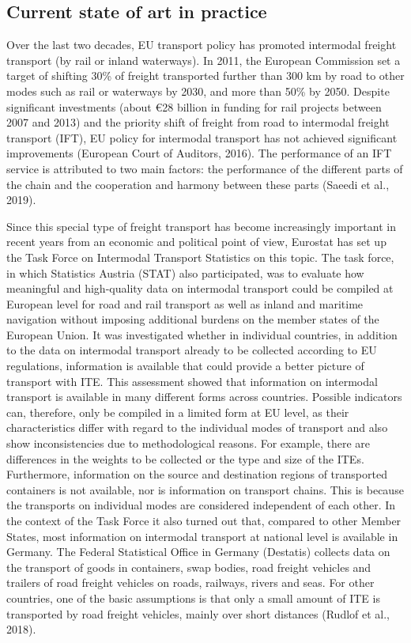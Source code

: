 \documentclass[
]{book}
\begin{document}
\hypertarget{current-state-of-art-in-practice-21}{%
\subsection*{Current state of art in practice}\label{current-state-of-art-in-practice-21}}

Over the last two decades, EU transport policy has promoted intermodal freight transport (by rail or inland waterways). In 2011, the European Commission set a target of shifting 30\% of freight transported further than 300 km by road to other modes such as rail or waterways by 2030, and more than 50\% by 2050. Despite significant investments (about €28 billion in funding for rail projects between 2007 and 2013) and the priority shift of freight from road to intermodal freight transport (IFT), EU policy for intermodal transport has not achieved significant improvements (European Court of Auditors, 2016). The performance of an IFT service is attributed to two main factors: the performance of the different parts of the chain and the cooperation and harmony between these parts (Saeedi et al., 2019).

Since this special type of freight transport has become increasingly important in recent years from an economic and political point of view, Eurostat has set up the Task Force on Intermodal Transport Statistics on this topic. The task force, in which Statistics Austria (STAT) also participated, was to evaluate how meaningful and high-quality data on intermodal transport could be compiled at European level for road and rail transport as well as inland and maritime navigation without imposing additional burdens on the member states of the European Union. It was investigated whether in individual countries, in addition to the data on intermodal transport already to be collected according to EU regulations, information is available that could provide a better picture of transport with ITE. This assessment showed that information on intermodal transport is available in many different forms across countries. Possible indicators can, therefore, only be compiled in a limited form at EU level, as their characteristics differ with regard to the individual modes of transport and also show inconsistencies due to methodological reasons. For example, there are differences in the weights to be collected or the type and size of the ITEs. Furthermore, information on the source and destination regions of transported containers is not available, nor is information on transport chains. This is because the transports on individual modes are considered independent of each other. In the context of the Task Force it also turned out that, compared to other Member States, most information on intermodal transport at national level is available in Germany. The Federal Statistical Office in Germany (Destatis) collects data on the transport of goods in containers, swap bodies, road freight vehicles and trailers of road freight vehicles on roads, railways, rivers and seas. For other countries, one of the basic assumptions is that only a small amount of ITE is transported by road freight vehicles, mainly over short distances (Rudlof et al., 2018).
\end{document}
